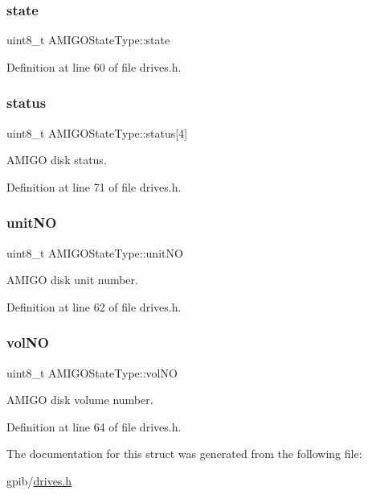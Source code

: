 \subsubsection{\texorpdfstring{state}{state}}
{\footnotesize\ttfamily uint8\+\_\+t A\+M\+I\+G\+O\+State\+Type\+::state}



Definition at line 60 of file drives.\+h.

\mbox{\label{structAMIGOStateType_a20ecb3cbbcb1fe4746c2d38edc125412}} 
\subsubsection{\texorpdfstring{status}{status}}
{\footnotesize\ttfamily uint8\+\_\+t A\+M\+I\+G\+O\+State\+Type\+::status\mbox{[}4\mbox{]}}



A\+M\+I\+GO disk status. 



Definition at line 71 of file drives.\+h.

\mbox{\label{structAMIGOStateType_a3d0cc02f8822c817feddf93dd08a5034}} 
\subsubsection{\texorpdfstring{unit\+NO}{unitNO}}
{\footnotesize\ttfamily uint8\+\_\+t A\+M\+I\+G\+O\+State\+Type\+::unit\+NO}



A\+M\+I\+GO disk unit number. 



Definition at line 62 of file drives.\+h.

\mbox{\label{structAMIGOStateType_a9825e282ac5844225a43b7f0835da67f}} 
\subsubsection{\texorpdfstring{vol\+NO}{volNO}}
{\footnotesize\ttfamily uint8\+\_\+t A\+M\+I\+G\+O\+State\+Type\+::vol\+NO}



A\+M\+I\+GO disk volume number. 



Definition at line 64 of file drives.\+h.



The documentation for this struct was generated from the following file\+:\begin{DoxyCompactItemize}
\item 
gpib/\hyperlink{drives_8h}{drives.\+h}\end{DoxyCompactItemize}
